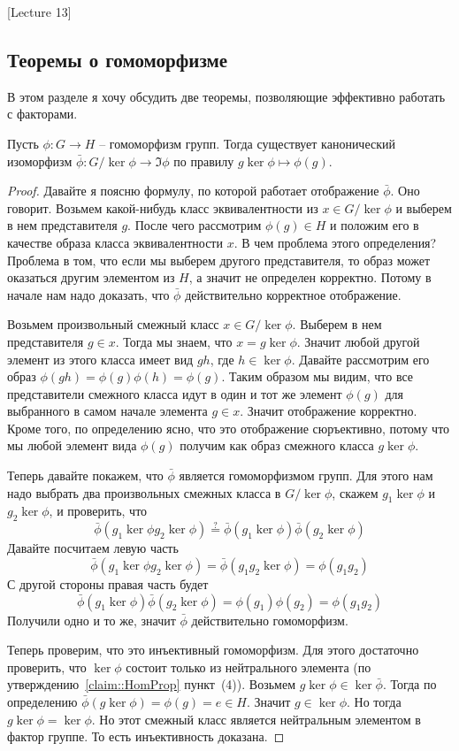 [Lecture 13]


\subsection{Теоремы о гомоморфизме}

В этом разделе я хочу обсудить две теоремы, позволяющие эффективно работать с факторами.

\begin{claim}
\label{claim::HomoThmGroups}
Пусть $\phi\colon G\to H$ -- гомоморфизм групп.
Тогда существует канонический изоморфизм $\bar \phi \colon G/\ker \phi \to \Im \phi$ по правилу $g\ker \phi \mapsto \phi(g)$.
\end{claim}
\begin{proof}
Давайте я поясню формулу, по которой работает отображение $\bar \phi$.
Оно говорит.
Возьмем какой-нибудь класс эквивалентности из $x\in G/\ker \phi$ и выберем в нем представителя $g$.
После чего рассмотрим $\phi(g)\in H$ и положим его в качестве образа класса эквивалентности $x$.
В чем проблема этого определения?
Проблема в том, что если мы выберем другого представителя, то образ может оказаться другим элементом из $H$, а значит не определен корректно.
Потому в начале нам надо доказать, что $\bar\phi$ действительно корректное отображение.

Возьмем произвольный смежный класс $x\in G/\ker \phi$.
Выберем в нем представителя $g\in x$.
Тогда мы знаем, что $x = g \ker \phi$.
Значит любой другой элемент из этого класса имеет вид $gh$, где $h\in \ker \phi$.
Давайте рассмотрим его образ $\phi(gh) = \phi(g) \phi(h) = \phi(g)$.
Таким образом мы видим, что все представители смежного класса идут в один и тот же элемент $\phi(g)$ для выбранного в самом начале элемента $g\in x$.
Значит отображение корректно.
Кроме того, по определению ясно, что это отображение сюръективно, потому что мы любой элемент вида $\phi(g)$ получим как образ смежного класса $g\ker \phi$.

Теперь давайте покажем, что $\bar \phi$ является гомоморфизмом групп.
Для этого нам надо выбрать два произвольных смежных класса в $G/\ker \phi$, скажем $g_1 \ker \phi$ и $g_2\ker \phi$, и проверить, что
\[
\bar\phi(g_1 \ker \phi g_2 \ker \phi) \stackrel{?}{=} \bar \phi(g_1 \ker \phi) \bar \phi(g_2 \ker \phi)
\]
Давайте посчитаем левую часть
\[
\bar\phi(g_1 \ker \phi g_2 \ker \phi) = \bar\phi(g_1 g_2 \ker \phi) = \phi(g_1g_2)
\]
С другой стороны правая часть будет
\[
\bar \phi(g_1 \ker \phi) \bar \phi(g_2 \ker \phi) = \phi(g_1) \phi(g_2) = \phi(g_1 g_2)
\]
Получили одно и то же, значит $\bar \phi$ действительно гомоморфизм.

Теперь проверим, что это инъективный гомоморфизм.
Для этого достаточно проверить, что $\ker \phi$ состоит только из нейтрального элемента (по утверждению~\ref{claim::HomProp} пункт~(4)).
Возьмем $g\ker \phi \in \ker \bar \phi$.
Тогда по определению $\bar\phi(g \ker \phi) = \phi(g) = e\in H$.
Значит $g\in \ker \phi$.
Но тогда $g\ker \phi = \ker \phi$.
Но этот смежный класс является нейтральным элементом в фактор группе.
То есть инъективность доказана.
\end{proof}

